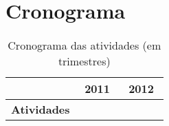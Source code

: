 \documentclass[12pt]{article}
\begin{document}
\section{Cronograma}
\label{sec:cronograma}

\begin{table}[htbp]
  \small
  \centering
  \begin{tabular}{|l||c|c|c|c||c|c|c|c|}
    \hline
    & \multicolumn{4}{|c||}{2011} & \multicolumn{4}{|c||}{2012} \\
    \hline
    \hline
    \textbf{Atividades}
  \end{tabular}
  \caption{Cronograma das atividades (em trimestres)}
  \label{tab:cronograma}
\end{table}

\nocite{marvin.ea95:generalization,sampaio.ea10:villa-lobos,sampaio.ea09:goiaba,sampaio.ea09:musical}

\renewcommand{\refname}{Bibliografia}


\end{document}
